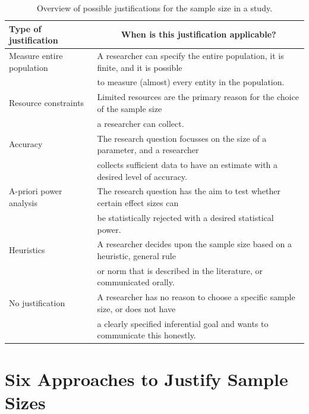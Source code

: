 \documentclass[
  english,
  ,jou,floatsintext]{apa6}
\begin{document}
\begin{table}[tbp]

\begin{center}
\begin{threeparttable}

\caption{\label{tab:table-pow-just}Overview of possible justifications for the sample size in a study.}

\begin{tabular}{ll}
\toprule
Type of justification & \multicolumn{1}{c}{When is this justification applicable?}\\
\midrule
Measure entire population & A researcher can specify the entire population, it is finite, and it is possible\\
 & to measure (almost) every entity in the population.\\ \midrule
Resource constraints & Limited resources are the primary reason for the choice of the sample size\\
 & a researcher can collect.\\ \midrule
Accuracy & The research question focusses on the size of a parameter, and a researcher\\
 & collects sufficient data to have an estimate with a desired level of accuracy.\\ \midrule
A-priori power analysis & The research question has the aim to test whether certain effect sizes can\\
 & be statistically rejected with a desired statistical power.\\ \midrule
Heuristics & A researcher decides upon the sample size based on a heuristic, general rule\\
 & or norm that is described in the literature, or communicated orally.\\ \midrule
No justification & A researcher has no reason to choose a specific sample size, or does not have\\
 & a clearly specified inferential goal and wants to communicate this honestly.\\
\bottomrule
\end{tabular}

\end{threeparttable}
\end{center}

\end{table}

\hypertarget{six-approaches-to-justify-sample-sizes}{%
\section{Six Approaches to Justify Sample Sizes}\label{six-approaches-to-justify-sample-sizes}}
\end{document}
